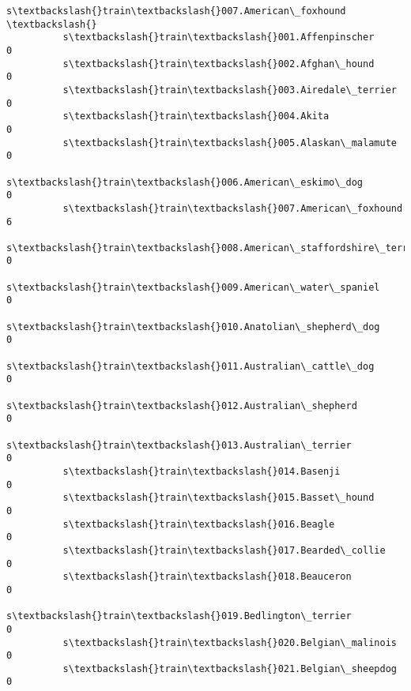 \documentclass[11pt]{article}
\begin{document}
\begin{Verbatim}[commandchars=\\\{\}]
                                                          s\textbackslash{}train\textbackslash{}007.American\_foxhound  \textbackslash{}
          s\textbackslash{}train\textbackslash{}001.Affenpinscher                                                   0   
          s\textbackslash{}train\textbackslash{}002.Afghan\_hound                                                    0   
          s\textbackslash{}train\textbackslash{}003.Airedale\_terrier                                                0   
          s\textbackslash{}train\textbackslash{}004.Akita                                                           0   
          s\textbackslash{}train\textbackslash{}005.Alaskan\_malamute                                                0   
          s\textbackslash{}train\textbackslash{}006.American\_eskimo\_dog                                             0   
          s\textbackslash{}train\textbackslash{}007.American\_foxhound                                               6   
          s\textbackslash{}train\textbackslash{}008.American\_staffordshire\_terrier                                  0   
          s\textbackslash{}train\textbackslash{}009.American\_water\_spaniel                                          0   
          s\textbackslash{}train\textbackslash{}010.Anatolian\_shepherd\_dog                                          0   
          s\textbackslash{}train\textbackslash{}011.Australian\_cattle\_dog                                           0   
          s\textbackslash{}train\textbackslash{}012.Australian\_shepherd                                             0   
          s\textbackslash{}train\textbackslash{}013.Australian\_terrier                                              0   
          s\textbackslash{}train\textbackslash{}014.Basenji                                                         0   
          s\textbackslash{}train\textbackslash{}015.Basset\_hound                                                    0   
          s\textbackslash{}train\textbackslash{}016.Beagle                                                          0   
          s\textbackslash{}train\textbackslash{}017.Bearded\_collie                                                  0   
          s\textbackslash{}train\textbackslash{}018.Beauceron                                                       0   
          s\textbackslash{}train\textbackslash{}019.Bedlington\_terrier                                              0   
          s\textbackslash{}train\textbackslash{}020.Belgian\_malinois                                                0   
          s\textbackslash{}train\textbackslash{}021.Belgian\_sheepdog                                                0   

\end{Verbatim}
\end{document}
